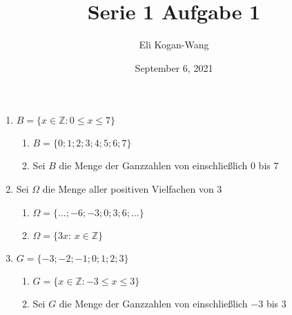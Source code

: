 \documentclass[a4paper,12pt]{article}
\title{Serie 1 Aufgabe 1}
\author{Eli Kogan-Wang}
\date{September 6, 2021}
\begin{document}
\begin{enumerate}[label=(\alph*)]
  \item $B=\{x\in\mathbb{Z}:0\le x\le7\}$
        \begin{enumerate}
          \item $B=\{0;1;2;3;4;5;6;7\}$
          \item Sei $B$ die Menge der Ganzzahlen von einschließlich $0$ bis $7$
        \end{enumerate}
  \item Sei $\Omega$ die Menge aller positiven Vielfachen von $3$
        \begin{enumerate}
          \item $\Omega=\{\dots;-6;-3;0;3;6;\dots\}$
          \item $\Omega=\{3x:\,x\in\mathbb{Z}\}$
        \end{enumerate}
  \item $G=\{−3;−2;−1;0;1;2;3\}$
        \begin{enumerate}
          \item $G=\{x\in\mathbb{Z}:-3\le x\le3\}$
          \item Sei $G$ die Menge der Ganzzahlen von einschließlich $-3$ bis $3$
        \end{enumerate}
\end{enumerate}
\end{document}
